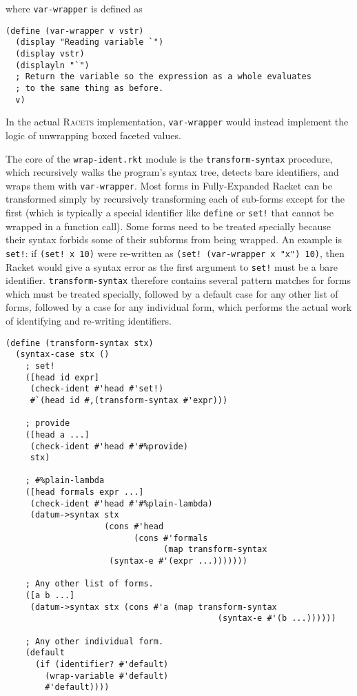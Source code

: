 \documentclass{article}
\begin{document}
where \texttt{var-wrapper} is defined as

\begin{lstlisting}
(define (var-wrapper v vstr)
  (display "Reading variable `")
  (display vstr)
  (displayln "`")
  ; Return the variable so the expression as a whole evaluates
  ; to the same thing as before.
  v)
\end{lstlisting}

In the actual \textsc{Racets} implementation, \texttt{var-wrapper} would instead implement the logic of unwrapping boxed faceted values.

The core of the \texttt{wrap-ident.rkt} module is the \texttt{transform-syntax} procedure, which recursively walks the program's syntax tree, detects bare identifiers, and wraps them with \texttt{var-wrapper}. Most forms in Fully-Expanded Racket can be transformed simply by recursively transforming each of sub-forms except for the first (which is typically a special identifier like \texttt{define} or \texttt{set!} that cannot be wrapped in a function call). Some forms need to be treated specially because their syntax forbids some of their subforms from being wrapped. An example is \texttt{set!}: if \texttt{(set! x 10)} were re-written as \texttt{(set! (var-wrapper x "x") 10)}, then Racket would give a syntax error as the first argument to \texttt{set!} must be a bare identifier. \texttt{transform-syntax} therefore contains several pattern matches for forms which must be treated specially, followed by a default case for any other list of forms, followed by a case for any individual form, which performs the actual work of identifying and re-writing identifiers.

\begin{lstlisting}
(define (transform-syntax stx)
  (syntax-case stx ()
    ; set!
    ([head id expr]
     (check-ident #'head #'set!)
     #`(head id #,(transform-syntax #'expr)))

    ; provide
    ([head a ...]
     (check-ident #'head #'#%provide)
     stx)

    ; #%plain-lambda
    ([head formals expr ...]
     (check-ident #'head #'#%plain-lambda)
     (datum->syntax stx
                    (cons #'head
                          (cons #'formals
                                (map transform-syntax
				     (syntax-e #'(expr ...)))))))

    ; Any other list of forms.
    ([a b ...]
     (datum->syntax stx (cons #'a (map transform-syntax
                                           (syntax-e #'(b ...))))))

    ; Any other individual form.
    (default
      (if (identifier? #'default)
        (wrap-variable #'default)
        #'default))))
\end{lstlisting}
\end{document}
